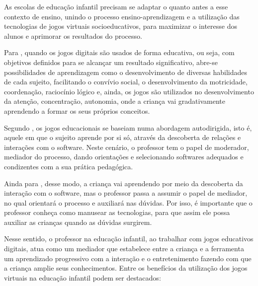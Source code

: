 \documentclass[article,12pt,openany,oneside,a4paper,english,brazil]{abntex2}
\begin{document}
As escolas de educação infantil precisam se adaptar o quanto antes a esse contexto de ensino, unindo o processo ensino-aprendizagem e a utilização das tecnologias de jogos virtuais socioeducativos, para maximizar o interesse dos alunos e aprimorar os resultados do processo.

Para , quando os jogos digitais são usados de forma educativa, ou seja, com objetivos definidos para se alcançar um resultado significativo, abre-se possibilidades de aprendizagem como o desenvolvimento de diversas habilidades de cada sujeito, facilitando o convívio social, o desenvolvimento da motricidade, coordenação, raciocínio lógico e, ainda, os jogos são utilizados no desenvolvimento da atenção, concentração, autonomia, onde a criança vai gradativamente aprendendo a formar os seus próprios conceitos.


Segundo , os jogos educacionais se baseiam numa abordagem autodirigida, isto é, aquele em que o sujeito aprende por si só, através da descoberta de relações e interações com o software. Neste cenário, o professor tem o papel de moderador, mediador do processo, dando orientações e selecionando softwares adequados e condizentes com a sua prática pedagógica.

Ainda para , desse modo, a criança vai aprendendo por meio da descoberta da interação com o software, mas o professor passa a assumir o papel de mediador, no qual orientará o processo e auxiliará  nas dúvidas. Por isso, é importante que o professor conheça como manusear as tecnologias, para que assim ele possa auxiliar as crianças quando as dúvidas surgirem.

Nesse sentido, o professor na educação infantil, ao trabalhar com jogos educativos digitais, atua como um mediador que estabelece entre a criança e a ferramenta um aprendizado progressivo com a interação e o entretenimento fazendo com que a criança amplie seus conhecimentos.
Entre os benefícios da utilização dos jogos virtuais na educação infantil podem ser destacados:
\end{document}
